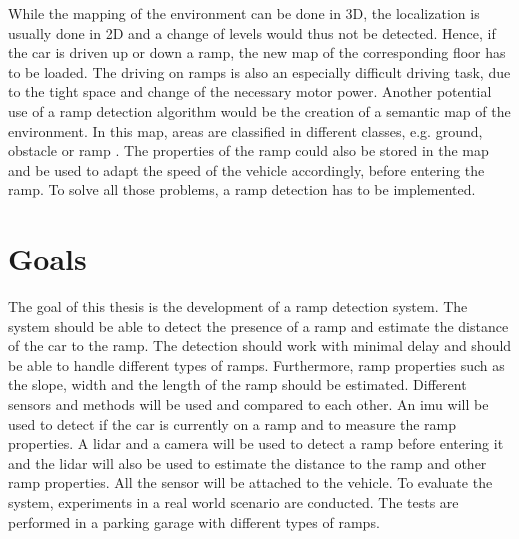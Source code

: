 While the mapping of the environment can be done in 3D, the localization is usually done in 2D and a change of levels would thus not be detected.
Hence, if the car is driven up or down a ramp, the new map of the corresponding floor has to be loaded.
The driving on ramps is also an especially difficult driving task, due to the tight space and change of the necessary motor power.
Another potential use of a ramp detection algorithm would be the creation of a semantic map of the environment.
In this map, areas are classified in different classes, e.g. ground, obstacle or ramp \cite{Sakenas2007}.
The properties of the ramp could also be stored in the map and be used to adapt the speed of the vehicle accordingly, before entering the ramp.
To solve all those problems, a ramp detection has to be implemented.



\section{Goals}
The goal of this thesis is the development of a ramp detection system.
The system should be able to detect the presence of a ramp and estimate the distance of the car to the ramp.
The detection should work with minimal delay and should be able to handle different types of ramps.
Furthermore, ramp properties such as the slope, width and the length of the ramp should be estimated.
Different sensors and methods will be used and compared to each other.
An \gls{imu} will be used to detect if the car is currently on a ramp and to measure the ramp properties.
A \gls{lidar} and a camera will be used to detect a ramp before entering it and the \gls{lidar} will also be used to estimate the distance to the ramp and other ramp properties.
All the sensor will be attached to the vehicle.
To evaluate the system, experiments in a real world scenario are conducted.
The tests are performed in a parking garage with different types of ramps.



